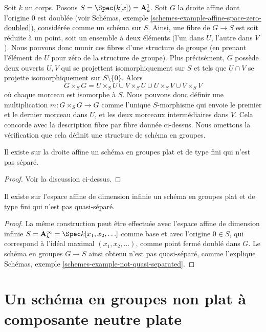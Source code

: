 \medskip\noindent
Soit $k$ un corps. Posons $S = \Spec(k[x]) = \mathbf{A}^1_k$.
Soit $G$ la droite affine dont l'origine $0$ est doublée (voir
Schémas, exemple \ref{schemes-example-affine-space-zero-doubled}),
considérée comme un schéma sur $S$. Ainsi, une fibre de $G \to S$ est soit
réduite à un point, soit un ensemble à deux éléments (l'un dans $U$, l'autre dans $V$).
Nous pouvons donc munir ces fibres d'une structure de groupe (en
prenant l'élément de $U$ pour zéro de la structure de groupe).
Plus précisément, $G$ possède deux ouverts $U, V$ qui se projettent isomorphiquement
sur $S$ et tels que $U \cap V$ se projette isomorphiquement sur
$S \setminus \{0\}$. Alors
$$
G \times_S G = U \times_S U \cup V \times_S U \cup
U \times_S V \cup V \times_S V
$$
où chaque morceau est isomorphe à $S$. Nous pouvons donc définir une multiplication
$m : G \times_S G \to G$ comme l'unique $S$-morphisme qui envoie le premier
et le dernier morceau dans $U$, et les deux morceaux intermédiaires dans $V$. Cela concorde avec
la description fibre par fibre donnée ci-dessus. Nous omettons la
vérification que cela définit une structure de schéma en groupes.

\begin{lemma}
\label{lemma-non-separated-group-scheme}
Il existe sur la droite affine un schéma en groupes plat et de type fini
qui n'est pas séparé.
\end{lemma}

\begin{proof}
Voir la discussion ci-dessus.
\end{proof}

\begin{lemma}
\label{lemma-non-quasi-separated-group-scheme}
Il existe sur l'espace affine de dimension infinie un schéma en groupes
plat et de type fini qui n'est pas quasi-séparé.
\end{lemma}

\begin{proof}
La même construction peut être effectuée avec l'espace affine de dimension infinie
$S = \mathbf{A}^\infty_k = \Spec k[x_1, x_2, \ldots]$ comme base
et avec l'origine $0 \in S$, qui correspond à l'idéal maximal
$(x_1, x_2, \ldots)$, comme point fermé doublé dans $G$.
Le schéma en groupes $G \rightarrow S$ ainsi obtenu
n'est pas quasi-séparé, comme l'explique
Schémas, exemple \ref{schemes-example-not-quasi-separated}.
\end{proof}



\section{Un schéma en groupes non plat à composante neutre plate}
\label{section-non-flat-group-scheme}


